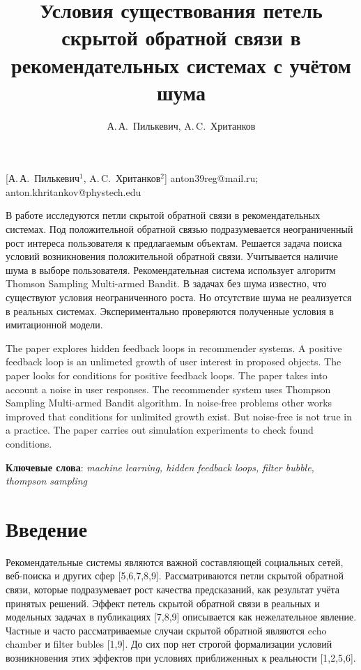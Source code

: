 \documentclass[12pt, twoside]{article}
\begin{document}
\title
    [] %
    {Условия существования петель скрытой обратной связи в рекомендательных системах с учётом шума}
\author
    [А.\,А.~Пилькевич] %
    {А.\,А.~Пилькевич, A.\,C.~Хританков} %
    [А.\,А.~Пилькевич$^1$, A.\,C.~Хританков$^2$] %
\email
   {anton39reg@mail.ru; anton.khritankov@phystech.edu}
\abstract
  {В работе исследуются петли скрытой обратной связи в рекомендательных системах.
  Под положительной обратной связью подразумевается неограниченный рост интереса пользователя к предлагаемым объектам. 
  Решается задача поиска условий возникновения положительной обратной связи. 
  Учитывается наличие шума в выборе пользователя.
  Рекомендательная система использует алгоритм Thomson Sampling Multi-armed Bandit.
  В задачах без шума известно, что существуют условия неограниченного роста. 
  Но отсутствие шума не реализуется в реальных системах.
  Экспериментально проверяются полученные условия в имитационной модели.

\bigskip
  The paper explores hidden feedback loops in recommender systems. 
  A positive feedback loop is an unlimeted growth of user interest in proposed objects.
  The paper looks for conditions for positive feedback loops. 
  The paper takes into account a noise in user responses.
  The recommender system uses Thompson Sampling Multi-armed Bandit algorithm.
  In noise-free problems other works improved that conditions for unlimited growth exist.
  But noise-free is not true in a practice.
  The paper carries out simulation experiments to check found conditions.

\bigskip
\noindent
\textbf{Ключевые слова}: \emph {machine learning, hidden feedback loops, filter bubble, thompson sampling}
}
\doi{}
\receivedRus{}
\receivedEng{}

\maketitle
\linenumbers
\section{Введение}
Рекомендательные системы являются важной составляющей социальных сетей, веб-поиска и других сфер [5,6,7,8,9]. 
Рассматриваются петли скрытой обратной связи, которые подразумевает рост качества предсказаний, как результат учёта принятых решений. 
Эффект петель скрытой обратной связи в реальных и модельных задачах в  публикациях [7,8,9] описывается как нежелательное явление. 
Частные и часто рассматриваемые случаи скрытой обратной являются echo chamber и filter bubles [1,9].
До сих пор нет строгой формализации условий возникновения этих эффектов при условиях приближенных к реальности [1,2,5,6]. 
\end{document}
